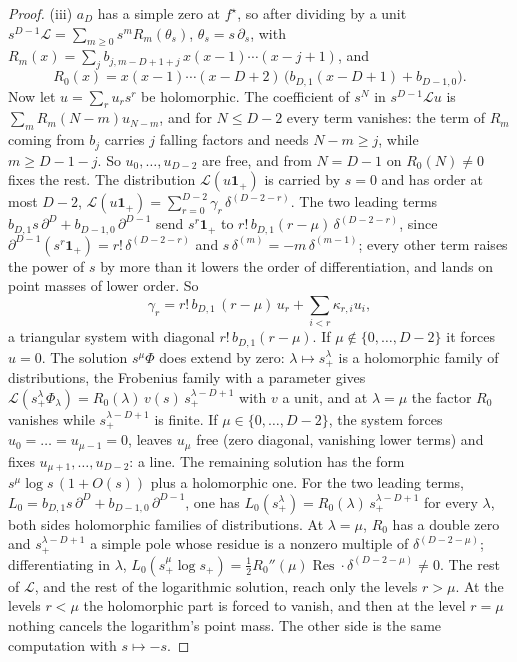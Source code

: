 \documentclass[11pt]{article}
\newcommand{\one}{\mathbf 1}
\theoremstyle{plain}
\theoremstyle{definition}
\theoremstyle{remark}
\begin{document}
\begin{proof}
(iii) $a_D$ has a simple zero at $f^\star$, so after dividing by a unit $s^{D-1}\mathcal L=\sum_{m\ge0}s^mR_m(\theta_s)$, $\theta_s=s\,\partial_s$, with $R_m(x)=\sum_jb_{j,m-D+1+j}\,x(x-1)\cdots(x-j+1)$, and
\[
R_0(x)=x(x-1)\cdots(x-D+2)\,\big(b_{D,1}(x-D+1)+b_{D-1,0}\big).
\]
Now let $u=\sum_ru_rs^r$ be holomorphic. The coefficient of $s^N$ in $s^{D-1}\mathcal Lu$ is $\sum_mR_m(N-m)u_{N-m}$, and for $N\le D-2$ every term vanishes: the term of $R_m$ coming from $b_j$ carries $j$ falling factors and needs $N-m\ge j$, while $m\ge D-1-j$. So $u_0,\dots,u_{D-2}$ are free, and from $N=D-1$ on $R_0(N)\neq0$ fixes the rest. The distribution $\mathcal L(u\one_+)$ is carried by $s=0$ and has order at most $D-2$, $\mathcal L(u\one_+)=\sum_{r=0}^{D-2}\gamma_r\,\delta^{(D-2-r)}$. The two leading terms $b_{D,1}s\,\partial^D+b_{D-1,0}\,\partial^{D-1}$ send $s^r\one_+$ to $r!\,b_{D,1}(r-\mu)\,\delta^{(D-2-r)}$, since $\partial^{D-1}(s^r\one_+)=r!\,\delta^{(D-2-r)}$ and $s\,\delta^{(m)}=-m\,\delta^{(m-1)}$; every other term raises the power of $s$ by more than it lowers the order of differentiation, and lands on point masses of lower order. So
\[
\gamma_r=r!\,b_{D,1}\,(r-\mu)\,u_r+\sum_{i<r}\kappa_{r,i}u_i ,
\]
a triangular system with diagonal $r!\,b_{D,1}(r-\mu)$. If $\mu\notin\{0,\dots,D-2\}$ it forces $u=0$. The solution $s^\mu\Phi$ does extend by zero: $\lambda\mapsto s_+^\lambda$ is a holomorphic family of distributions, the Frobenius family with a parameter gives $\mathcal L(s_+^\lambda\Phi_\lambda)=R_0(\lambda)\,v(s)\,s_+^{\lambda-D+1}$ with $v$ a unit, and at $\lambda=\mu$ the factor $R_0$ vanishes while $s_+^{\lambda-D+1}$ is finite. If $\mu\in\{0,\dots,D-2\}$, the system forces $u_0=\dots=u_{\mu-1}=0$, leaves $u_\mu$ free (zero diagonal, vanishing lower terms) and fixes $u_{\mu+1},\dots,u_{D-2}$: a line. The remaining solution has the form $s^\mu\log s\,(1+O(s))$ plus a holomorphic one. For the two leading terms, $L_0=b_{D,1}s\,\partial^D+b_{D-1,0}\,\partial^{D-1}$, one has $L_0(s_+^\lambda)=R_0(\lambda)\,s_+^{\lambda-D+1}$ for every $\lambda$, both sides holomorphic families of distributions. At $\lambda=\mu$, $R_0$ has a double zero and $s_+^{\lambda-D+1}$ a simple pole whose residue is a nonzero multiple of $\delta^{(D-2-\mu)}$; differentiating in $\lambda$, $L_0(s_+^\mu\log s_+)=\frac12R_0''(\mu)\operatorname{Res}\cdot\delta^{(D-2-\mu)}\neq0$. The rest of $\mathcal L$, and the rest of the logarithmic solution, reach only the levels $r>\mu$. At the levels $r<\mu$ the holomorphic part is forced to vanish, and then at the level $r=\mu$ nothing cancels the logarithm's point mass. The other side is the same computation with $s\mapsto-s$.


\end{proof}
\end{document}
